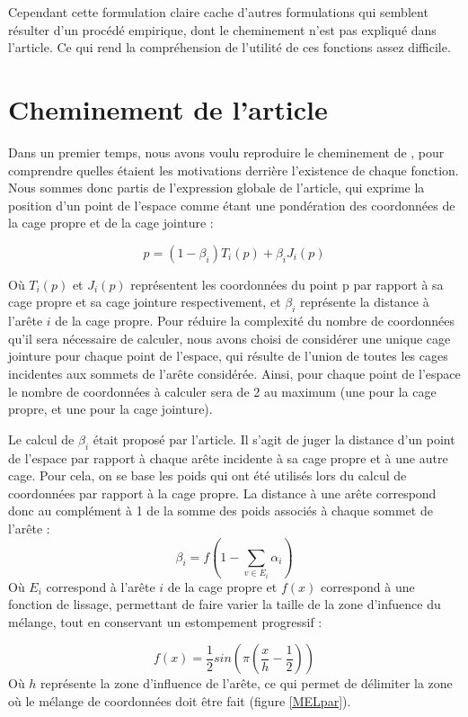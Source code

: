 Cependant cette formulation claire cache d'autres formulations qui
semblent résulter d'un procédé empirique, dont le cheminement n'est
pas expliqué dans l'article. Ce qui rend la compréhension de l'utilité
de ces fonctions assez difficile.

\section{Cheminement de l'article}
Dans un premier temps, nous avons voulu reproduire le cheminement de
\cite{GPCP13}, pour comprendre quelles étaient les motivations
derrière l'existence de chaque fonction. Nous sommes donc partis de
l'expression globale de l'article, qui exprime la position d'un point
de l'espace comme étant une pondération des coordonnées de la cage
propre et de la cage jointure :

\begin{equation}
  p = (1 - \beta_i) T_i(p)  + \beta_i J_i(p) 
  \label{MELgen}
\end{equation}

Où $T_i(p)$ et $J_i(p)$ représentent les coordonnées du point p par
rapport à sa cage propre et sa cage jointure respectivement, et
$\beta_i$ représente la distance à l'arête $i$ de la cage propre. Pour
réduire la complexité du nombre de coordonnées qu'il sera nécessaire
de calculer, nous avons choisi de considérer une unique cage jointure
pour chaque point de l'espace, qui résulte de l'union de toutes les
cages incidentes aux sommets de l'arête considérée. Ainsi, pour chaque
point de l'espace le nombre de coordonnées à calculer sera de 2 au
maximum (une pour la cage propre, et une pour la cage jointure).

Le calcul de $\beta_i$ était proposé par l'article. Il s'agit de juger
la distance d'un point de l'espace par rapport à chaque arête
incidente à sa cage propre et à une autre cage. Pour cela, on se base
les poids qui ont été utilisés lors du calcul de coordonnées par
rapport à la cage propre. La distance à une arête correspond donc au
complément à 1 de la somme des poids associés à chaque sommet de
l'arête :
\begin{equation}
  \beta_{i} = f(1 - \sum_{v \in E_i} \alpha_i)
\end{equation}
Où $E_i$ correspond à l'arête $i$ de la cage propre et $f(x)$
correspond à une fonction de lissage, permettant de faire varier la
taille de la zone d'infuence du mélange, tout en conservant un
estompement progressif :

\begin{equation}
  f(x) = \frac{1}{2} sin(\pi(\frac{x}{h}-\frac{1}{2}))
\end{equation}
Où $h$ représente la zone d'influence de l'arête, ce qui permet de
délimiter la zone où le mélange de coordonnées doit être fait (figure
\ref{MELpar}).

